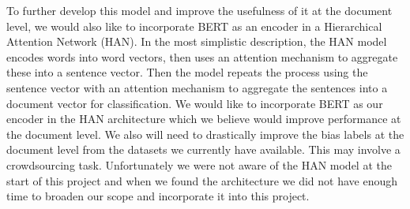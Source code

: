 \documentclass[10pt,a4paper,onecolumn]{article}
\begin{document}
To further develop this model and improve the usefulness of it at the document level, we would also like to incorporate BERT as an encoder in a Hierarchical Attention Network (HAN). In the most simplistic description, the HAN model encodes words into word vectors, then uses an attention mechanism to aggregate these into a sentence vector. Then the model repeats the process using the sentence vector with an attention mechanism to aggregate the sentences into a document vector for classification. We would like to incorporate BERT as our encoder in the HAN architecture which we believe would improve performance at the document level. We also will need to drastically improve the bias labels at the document level from the datasets we currently have available. This may involve a crowdsourcing task. Unfortunately we were not aware of the HAN model at the start of this project and when we found the architecture we did not have enough time to broaden our scope and incorporate it into this project.



\end{document}
